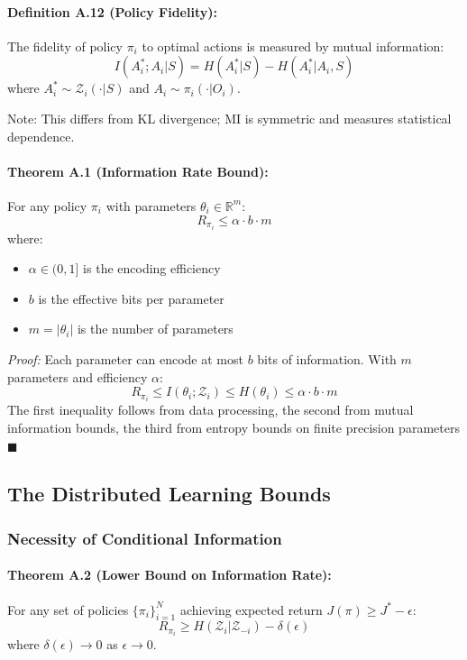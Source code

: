 \documentclass[10pt, letterpaper]{article}
\begin{document}
\paragraph{Definition A.12 (Policy Fidelity):} The fidelity of policy $\pi_i$ to optimal actions is measured by mutual information:
\[I(A_i^*; A_i | S) = H(A_i^*|S) - H(A_i^*|A_i, S)\]
where $A_i^* \sim \mathcal{Z}_i(\cdot|S)$ and $A_i \sim \pi_i(\cdot|O_i)$.

Note: This differs from KL divergence; MI is symmetric and measures statistical dependence.

\paragraph{Theorem A.1 (Information Rate Bound):} For any policy $\pi_i$ with parameters $\theta_i \in \mathbb{R}^m$:
\[R_{\pi_i} \leq \alpha \cdot b \cdot m\]
where:
\begin{itemize}
    \item $\alpha \in (0,1]$ is the encoding efficiency
    \item $b$ is the effective bits per parameter
    \item $m = |\theta_i|$ is the number of parameters
\end{itemize}
\emph{Proof:} Each parameter can encode at most $b$ bits of information. With $m$ parameters and efficiency $\alpha$:
\[R_{\pi_i} \leq I(\theta_i; \mathcal{Z}_i) \leq H(\theta_i) \leq \alpha \cdot b \cdot m\]
The first inequality follows from data processing, the second from mutual information bounds, the third from entropy bounds on finite precision parameters $\blacksquare$

\subsection{The Distributed Learning Bounds}

\subsubsection{Necessity of Conditional Information}

\paragraph{Theorem A.2 (Lower Bound on Information Rate):} For any set of policies $\{\pi_i\}_{i=1}^N$ achieving expected return $J(\pi) \geq J^* - \epsilon$:
\[R_{\pi_i} \geq H(\mathcal{Z}_i | \mathcal{Z}_{-i}) - \delta(\epsilon)\]
where $\delta(\epsilon) \to 0$ as $\epsilon \to 0$.
\end{document}
